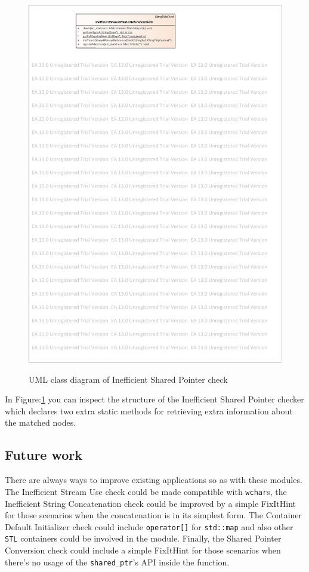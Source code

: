 \begin{figure}[H]
	\caption{UML class diagram of Inefficient Shared Pointer check}
	\centering
	\includegraphics[scale=1.8]{images/InefficientSharedPtr.pdf}
	\label{shared_ptr_check}
\end{figure}
\par In Figure:\ref{shared_ptr_check} you can inspect the structure of the Inefficient Shared Pointer checker which declares two extra static methods for retrieving extra information about the matched nodes. 
\subsection{Future work}
\par There are always ways to improve existing applications so as with these modules. The Inefficient Stream Use check could be made compatible with \verb|wchar|s, the Inefficient String Concatenation check could be improved by a simple FixItHint for those scenarios when the concatenation is in its simplest form. The Container Default Initializer check could include \verb|operator[]| for \verb|std::map| and also other \verb|STL| containers could be involved in the module. Finally, the Shared Pointer Conversion check could include a simple FixItHint for those scenarios when there's no usage of the \verb|shared_ptr|'s API inside the function.